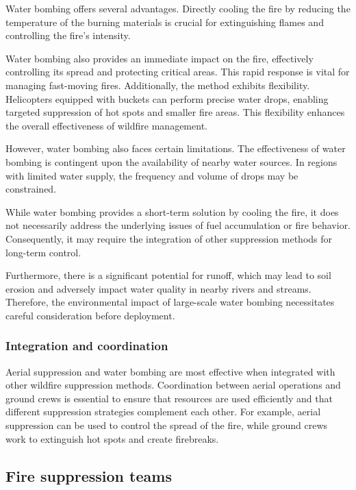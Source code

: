 \documentclass[
  12 pt,
]{Nemilov}
\begin{document}
Water bombing offers several advantages. Directly cooling the fire by reducing the temperature of the burning materials is crucial for extinguishing flames and controlling the fire's intensity.

Water bombing also provides an immediate impact on the fire, effectively controlling its spread and protecting critical areas. This rapid response is vital for managing fast-moving fires. Additionally, the method exhibits flexibility. Helicopters equipped with buckets can perform precise water drops, enabling targeted suppression of hot spots and smaller fire areas. This flexibility enhances the overall effectiveness of wildfire management.

However, water bombing also faces certain limitations. The effectiveness of water bombing is contingent upon the availability of nearby water sources. In regions with limited water supply, the frequency and volume of drops may be constrained.

While water bombing provides a short-term solution by cooling the fire, it does not necessarily address the underlying issues of fuel accumulation or fire behavior. Consequently, it may require the integration of other suppression methods for long-term control.

Furthermore, there is a significant potential for runoff, which may lead to soil erosion and adversely impact water quality in nearby rivers and streams. Therefore, the environmental impact of large-scale water bombing necessitates careful consideration before deployment.

\subsubsection{Integration and coordination}\label{integration-and-coordination}

Aerial suppression and water bombing are most effective when integrated with other wildfire suppression methods. Coordination between aerial operations and ground crews is essential to ensure that resources are used efficiently and that different suppression strategies complement each other. For example, aerial suppression can be used to control the spread of the fire, while ground crews work to extinguish hot spots and create firebreaks.

\subsection{Fire suppression teams}\label{fire-suppression-teams}
\end{document}
